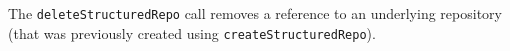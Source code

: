 The \verb+deleteStructuredRepo+ call removes a reference to an underlying repository (that was previously
created using \verb+createStructuredRepo+).
